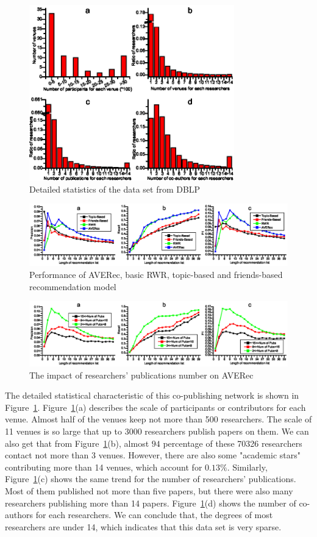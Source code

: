 \documentclass[9pt]{acm_proc_article-sp}
\begin{document}
\begin{figure}[t]
\centering
\includegraphics [width=3.5in]{Fig3.eps}
\caption{Detailed statistics of the data set from DBLP}
\label{fig3}
\end{figure}
\begin{figure}[hbt]
\centering
\includegraphics [width=\textwidth]{Fig4.eps}
\caption{Performance of AVERec, basic RWR, topic-based and friends-based recommendation model}
\label{fig4}
\end{figure}
\begin{figure}[hbt]
\centering
\includegraphics [width=\textwidth]{Fig5.eps}
\caption{The impact of researchers' publications number on AVERec}
\label{fig5}
\end{figure}

The detailed statistical characteristic of this co-publishing network is shown in Figure~\ref{fig3}. Figure~\ref{fig3}(a) describes the scale of participants or contributors for each venue. Almost half of the venues keep not more than 500 researchers. The scale of 11 venues is so large that up to 3000 researchers publish papers on them. We can also get that from Figure~\ref{fig3}(b), almost $94$ percentage of these 70326 researchers contact not more than 3 venues. However, there are also some "academic stars" contributing more than 14 venues, which account for $0.13\%$. Similarly, Figure~\ref{fig3}(c) shows the same trend for the number of researchers' publications. Most of them published not more than five papers, but there were also many researchers publishing more than 14 papers. Figure~\ref{fig3}(d) shows the number of co-authors for each researchers. We can conclude that, the degrees of most researchers are under 14, which indicates that this data set is very sparse.
\end{document}
